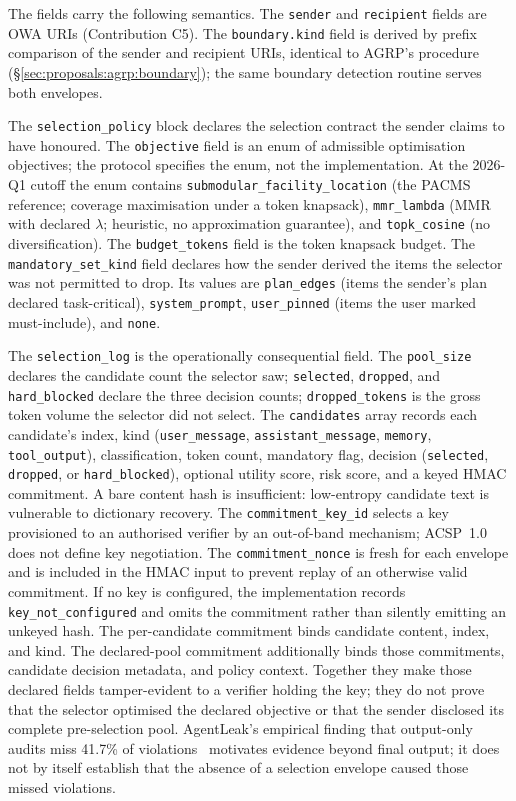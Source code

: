 The fields carry the following semantics. The
\texttt{sender} and \texttt{recipient} fields are OWA
URIs (Contribution C5). The \texttt{boundary.kind} field
is derived by prefix comparison of the sender and
recipient URIs, identical to AGRP's procedure
(\S\ref{sec:proposals:agrp:boundary}); the same boundary
detection routine serves both envelopes.

The \texttt{selection\_policy} block declares the
selection contract the sender claims to have honoured.
The \texttt{objective} field is an enum of admissible
optimisation objectives; the protocol specifies the enum,
not the implementation. At the 2026-Q1 cutoff the enum
contains \texttt{submodular\_\allowbreak{}facility\_\allowbreak{}location} (the
PACMS reference; coverage maximisation under a token
knapsack),
\texttt{mmr\_lambda} (MMR with declared
\(\lambda\); heuristic, no approximation guarantee), and
\texttt{topk\_cosine} (no diversification). The
\texttt{budget\_tokens} field is the token knapsack
budget. The \texttt{mandatory\_set\_kind} field declares
how the sender derived the items the selector was not
permitted to drop. Its values are \texttt{plan\_edges}
(items the sender's plan declared task-critical),
\texttt{system\_prompt}, \texttt{user\_pinned} (items the
user marked must-include), and \texttt{none}.

The \texttt{selection\_log} is the operationally
consequential field. The \texttt{pool\_size} declares the
candidate count the selector saw; \texttt{selected},
\texttt{dropped}, and \texttt{hard\_blocked} declare the
three decision counts; \texttt{dropped\_tokens} is the gross
token volume the selector did not select. The
\texttt{candidates} array records each candidate's index,
kind (\texttt{user\_message}, \texttt{assistant\_message},
\texttt{memory}, \texttt{tool\_output}), classification,
token count, mandatory flag, decision
(\texttt{selected}, \texttt{dropped},
or \texttt{hard\_blocked}), optional utility score, risk
score, and a keyed HMAC commitment. A bare content hash is
insufficient: low-entropy candidate text is vulnerable to
dictionary recovery. The \texttt{commitment\_key\_id}
selects a key provisioned to an authorised verifier by an
out-of-band mechanism; ACSP~1.0 does not define key
negotiation. The \texttt{commitment\_nonce} is fresh for
each envelope and is included in the HMAC input to prevent
replay of an otherwise valid commitment. If no key is
configured, the implementation records
\texttt{key\_not\_configured} and omits the commitment
rather than silently emitting an unkeyed hash. The
per-candidate commitment binds candidate content, index,
and kind. The declared-pool commitment additionally binds
those commitments, candidate decision metadata, and policy
context. Together they make those declared fields
tamper-evident to a verifier holding the key; they do not
prove that the selector optimised the declared objective or
that the sender disclosed its complete pre-selection pool.
AgentLeak's empirical
finding that output-only audits miss 41.7\% of violations~\cite{agentleak}
motivates evidence beyond final output; it does not by
itself establish that the absence of a selection envelope
caused those missed violations.

